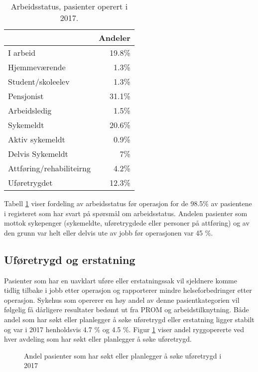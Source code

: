 \begin{table}[ht]
\centering
\begin{tabular}{lr}
  \hline
 & Andeler \\ 
  \hline
I arbeid & 19.8\% \\ 
  Hjemmeværende & 1.3\% \\ 
  Student/skoleelev & 1.3\% \\ 
  Pensjonist & 31.1\% \\ 
  Arbeidsledig & 1.5\% \\ 
  Sykemeldt & 20.6\% \\ 
  Aktiv sykemeldt & 0.9\% \\ 
  Delvis Sykemeldt & 7\% \\ 
  Attføring/rehabiliteirng & 4.2\% \\ 
  Uføretrygdet & 12.3\% \\ 
   \hline
\end{tabular}
\caption{Arbeidsstatus, pasienter operert i 2017.} 
\label{tab:Arb}
\end{table}


Tabell \ref{tab:Arb} viser fordeling av arbeidsstatus før operasjon for de 98.5\% 
av pasientene i registeret som har svart på spørsmål om arbeidsstatus. 
Andelen pasienter som mottok sykepenger (sykemeldte, uføretrygdede eller personer 
på attføring) og av den grunn var helt eller delvis ute av jobb før operasjonen var 
45 \%. 



\subsection{Uføretrygd og erstatning }




Pasienter som har en uavklart uføre eller erstatningssak vil sjeldnere komme tidlig tilbake i jobb etter operasjon og rapporterer mindre helseforbedringer etter operasjon. Sykehus som opererer en høy andel av denne pasientkategorien vil følgelig få dårligere resultater bedømt ut fra PROM og arbeidstilknytning.
Både andel som har søkt eller planlegger å søke uføretrygd eller erstatning ligger stabilt og var i 2017 
henholdsvis 4.7 \% og 4.5 \%. 
Figur \ref{fig:Ufor} viser andel ryggopererte ved hver avdeling som har søkt eller planlegger å søke uføretrygd.

\begin{figure}[ht]
\caption{\label{fig:Ufor} Andel pasienter som har søkt eller planlegger å søke uføretrygd i 2017} 
\end{figure}


